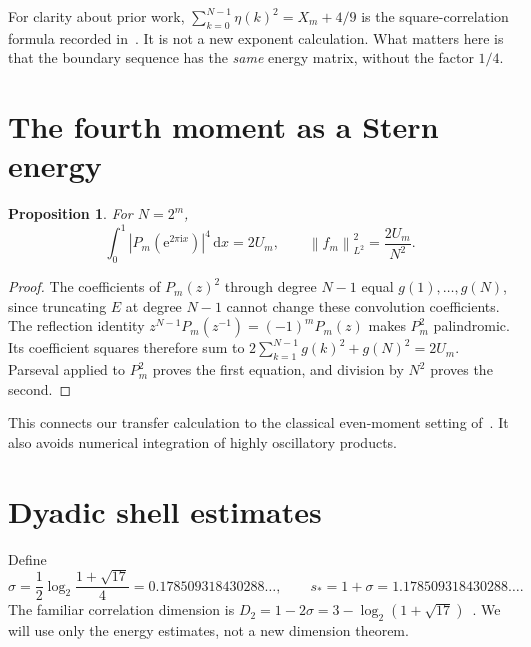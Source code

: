 \documentclass[11pt,a4paper,oneside,openany]{book}
\numberwithin{equation}{chapter}
\newtheorem{proposition}[theorem]{Proposition}
\theoremstyle{definition}
\theoremstyle{remark}
\newcommand{\dd}{\,\mathrm d}
\newcommand{\ee}{\mathrm e}
\newcommand{\ii}{\mathrm i}
\newcommand{\norm}[1]{\left\lVert #1\right\rVert}
\begin{document}
For clarity about prior work, $\sum_{k=0}^{N-1}\eta(k)^2=X_m+4/9$ is the
square-correlation formula recorded in~\cite{cmps}. It is not a new exponent
calculation. What matters here is that the boundary sequence has the \emph{same}
energy matrix, without the factor $1/4$.

\section{The fourth moment as a Stern energy}
\begin{proposition}
\label{bc:prop:fourth}
For $N=2^m$,
\begin{equation}
 \int_0^1|P_m(\ee^{2\pi\ii x})|^4\dd x=2U_m,
 \qquad \norm{f_m}_{L^2}^2=\frac{2U_m}{N^2}.
 \label{bc:eq:fourth}
\end{equation}
\end{proposition}
\begin{proof}
The coefficients of $P_m(z)^2$ through degree $N-1$ equal
$g(1),\ldots,g(N)$, since truncating $E$ at degree $N-1$ cannot change these
convolution coefficients. The reflection identity
$z^{N-1}P_m(z^{-1})=(-1)^mP_m(z)$ makes $P_m^2$ palindromic. Its coefficient
squares therefore sum to
$2\sum_{k=1}^{N-1}g(k)^2+g(N)^2=2U_m$. Parseval applied to $P_m^2$ proves the
first equation, and division by $N^2$ proves the second.
\end{proof}

This connects our transfer calculation to the classical even-moment setting
of~\cite{mmr}. It also avoids numerical integration of highly oscillatory products.

\section{Dyadic shell estimates}
Define
\begin{equation}
 \sigma=\frac12\log_2\frac{1+\sqrt{17}}4
       =0.178509318430288\ldots,\qquad
 s_* = 1+\sigma=1.178509318430288\ldots.
 \label{bc:eq:exponents}
\end{equation}
The familiar correlation dimension is $D_2=1-2\sigma
=3-\log_2(1+\sqrt{17})$~\cite{zaks}. We will use only the energy estimates,
not a new dimension theorem.
\end{document}
